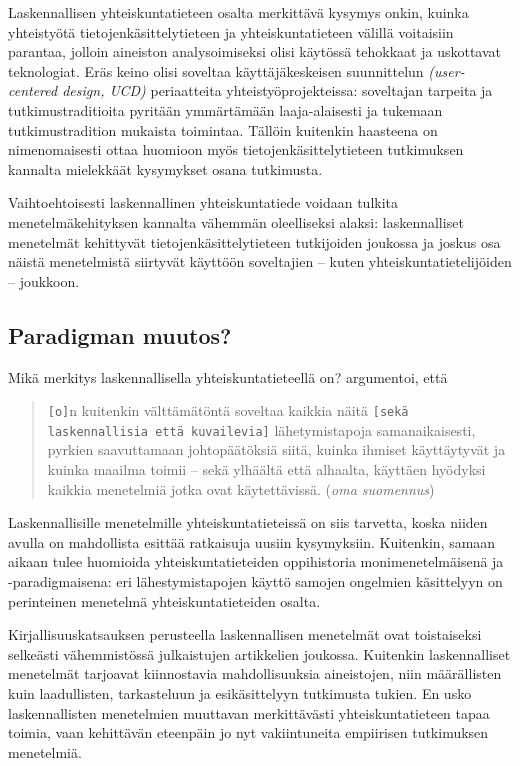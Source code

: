 \documentclass[finnish,gradu,twoside,12pt]{tktltiki}
\begin{document}
{Laskennallisen yhteiskuntatieteen osalta merkittävä kysymys onkin, kuinka yhteistyötä tietojenkäsittelytieteen ja yhteiskuntatieteen välillä voitaisiin parantaa, jolloin aineiston analysoimiseksi olisi käytössä tehokkaat ja uskottavat teknologiat. Eräs keino olisi soveltaa käyttäjäkeskeisen suunnittelun \textit{(user-centered design, UCD)} periaatteita yhteistyöprojekteissa: soveltajan tarpeita ja tutkimustraditioita pyritään ymmärtämään laaja-alaisesti ja tukemaan tutkimustradition mukaista toimintaa. Tällöin kuitenkin haasteena on nimenomaisesti ottaa huomioon myös tietojenkäsittelytieteen tutkimuksen kannalta mielekkäät kysymykset osana tutkimusta.

Vaihtoehtoisesti laskennallinen yhteiskuntatiede voidaan tulkita menetelmäkehityksen kannalta vähemmän oleelliseksi alaksi: laskennalliset menetelmät kehittyvät tietojenkäsittelytieteen tutkijoiden joukossa ja joskus osa näistä menetelmistä siirtyvät käyttöön soveltajien -- kuten yhteiskuntatietelijöiden -- joukkoon.

\subsection{Paradigman muutos?}

Mikä merkitys laskennallisella yhteiskuntatieteellä on? \citet[265]{watts11} argumentoi, että

\begin{quote}
\texttt{[o]}n kuitenkin välttämätöntä soveltaa kaikkia näitä \texttt{[sekä laskennallisia että kuvailevia]} lähetymistapoja samanaikaisesti, pyrkien saavuttamaan johtopäätöksiä siitä, kuinka ihmiset käyttäytyvät ja kuinka maailma toimii -- sekä ylhäältä että alhaalta, käyttäen hyödyksi kaikkia menetelmiä jotka ovat käytettävissä. (\textit{oma suomennus})
\end{quote}

Laskennallisille menetelmille yhteiskuntatieteissä on siis tarvetta, koska niiden avulla on mahdollista esittää ratkaisuja uusiin kysymyksiin. Kuitenkin, samaan aikaan tulee huomioida yhteiskuntatieteiden oppihistoria monimenetelmäisenä ja -paradigmaisena: eri lähestymistapojen käyttö samojen ongelmien käsittelyyn on perinteinen menetelmä yhteiskuntatieteiden osalta.

Kirjallisuuskatsauksen perusteella laskennallisen menetelmät ovat toistaiseksi selkeästi vähemmistössä julkaistujen artikkelien joukossa. Kuitenkin laskennalliset menetelmät tarjoavat kiinnostavia mahdollisuuksia aineistojen, niin määrällisten kuin laadullisten, tarkasteluun ja esikäsittelyyn tutkimusta tukien. En usko laskennallisten menetelmien muuttavan merkittävästi yhteiskuntatieteen tapaa toimia, vaan kehittävän eteenpäin jo nyt vakiintuneita empiirisen tutkimuksen menetelmiä.

}
\end{document}
